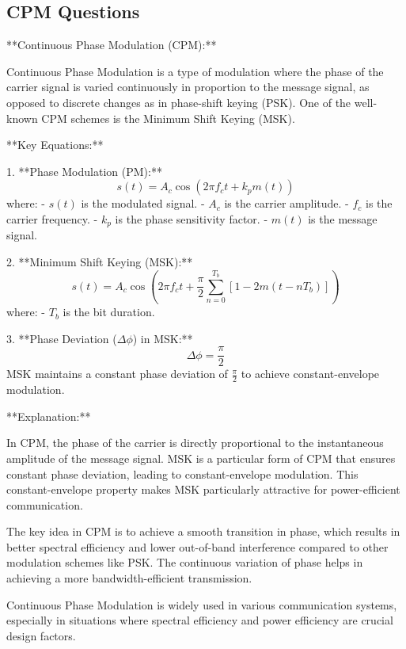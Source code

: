 \documentclass[colorlinks,11pt,a4paper,normalphoto,withhyper,ragged2e]{altareport}
\begin{document}
				
				
				
		
	
	\pagebreak
	
	
	
	
		\subsection{CPM Questions}
			
			
			
			
			**Continuous Phase Modulation (CPM):**
			
			Continuous Phase Modulation is a type of modulation where the phase of the carrier signal is varied continuously in proportion to the message signal, as opposed to discrete changes as in phase-shift keying (PSK). One of the well-known CPM schemes is the Minimum Shift Keying (MSK).
			
			**Key Equations:**
			
			1. **Phase Modulation (PM):**
			\[ s(t) = A_c \cos\left(2\pi f_c t + k_p m(t)\right) \]
			where:
			- \(s(t)\) is the modulated signal.
			- \(A_c\) is the carrier amplitude.
			- \(f_c\) is the carrier frequency.
			- \(k_p\) is the phase sensitivity factor.
			- \(m(t)\) is the message signal.
			
			2. **Minimum Shift Keying (MSK):**
			\[ s(t) = A_c \cos\left(2\pi f_c t + \frac{\pi}{2}\sum_{n=0}^{T_b}\left[1-2m(t-nT_b)\right]\right) \]
			where:
			- \(T_b\) is the bit duration.
			
			3. **Phase Deviation (\(\Delta \phi\)) in MSK:**
			\[ \Delta \phi = \frac{\pi}{2} \]
			MSK maintains a constant phase deviation of \(\frac{\pi}{2}\) to achieve constant-envelope modulation.
			
			**Explanation:**
			
			In CPM, the phase of the carrier is directly proportional to the instantaneous amplitude of the message signal. MSK is a particular form of CPM that ensures constant phase deviation, leading to constant-envelope modulation. This constant-envelope property makes MSK particularly attractive for power-efficient communication.
			
			The key idea in CPM is to achieve a smooth transition in phase, which results in better spectral efficiency and lower out-of-band interference compared to other modulation schemes like PSK. The continuous variation of phase helps in achieving a more bandwidth-efficient transmission.
			
			Continuous Phase Modulation is widely used in various communication systems, especially in situations where spectral efficiency and power efficiency are crucial design factors.
			
\end{document}
